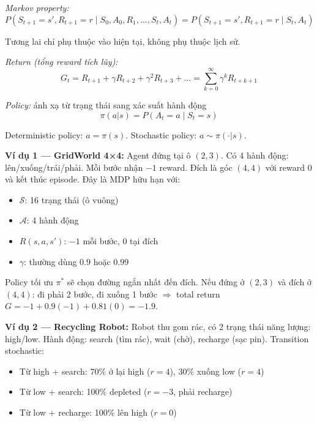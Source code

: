 \documentclass[12pt,a4paper]{article}
\begin{document}
\textit{Markov property:}
\begin{equation}
P(S_{t+1}=s', R_{t+1}=r \mid S_0, A_0, R_1, \ldots, S_t, A_t) = P(S_{t+1}=s', R_{t+1}=r \mid S_t, A_t)
\end{equation}

Tương lai chỉ phụ thuộc vào hiện tại, không phụ thuộc lịch sử.

\textit{Return (tổng reward tích lũy):}
\begin{equation}
G_t = R_{t+1} + \gamma R_{t+2} + \gamma^2 R_{t+3} + \ldots = \sum_{k=0}^{\infty} \gamma^k R_{t+k+1}
\end{equation}

\textit{Policy:} ánh xạ từ trạng thái sang xác suất hành động
\begin{equation}
\pi(a|s) = P(A_t=a \mid S_t=s)
\end{equation}

Deterministic policy: $a = \pi(s)$. Stochastic policy: $a \sim \pi(\cdot|s)$.

\textbf{Ví dụ 1 --- GridWorld 4×4:} Agent đứng tại ô $(2,3)$. Có 4 hành động: lên/xuống/trái/phải. Mỗi bước nhận $-1$ reward. Đích là góc $(4,4)$ với reward $0$ và kết thúc episode. Đây là MDP hữu hạn với:
\begin{itemize}[leftmargin=1.5em]
    \item $\mathcal{S}$: 16 trạng thái (ô vuông)
    \item $\mathcal{A}$: 4 hành động
    \item $R(s,a,s')$: $-1$ mỗi bước, $0$ tại đích
    \item $\gamma$: thường dùng $0.9$ hoặc $0.99$
\end{itemize}

Policy tối ưu $\pi^*$ sẽ chọn đường ngắn nhất đến đích. Nếu đứng ở $(2,3)$ và đích ở $(4,4)$: đi phải 2 bước, đi xuống 1 bước $\Rightarrow$ total return $G = -1 + 0.9(-1) + 0.81(0) = -1.9$.

\textbf{Ví dụ 2 --- Recycling Robot:} Robot thu gom rác, có 2 trạng thái năng lượng: high/low. Hành động: search (tìm rác), wait (chờ), recharge (sạc pin). Transition stochastic:
\begin{itemize}[leftmargin=1.5em]
    \item Từ high + search: 70\% ở lại high ($r=4$), 30\% xuống low ($r=4$)
    \item Từ low + search: 100\% depleted ($r=-3$, phải recharge)
    \item Từ low + recharge: 100\% lên high ($r=0$)
\end{itemize}
\end{document}
